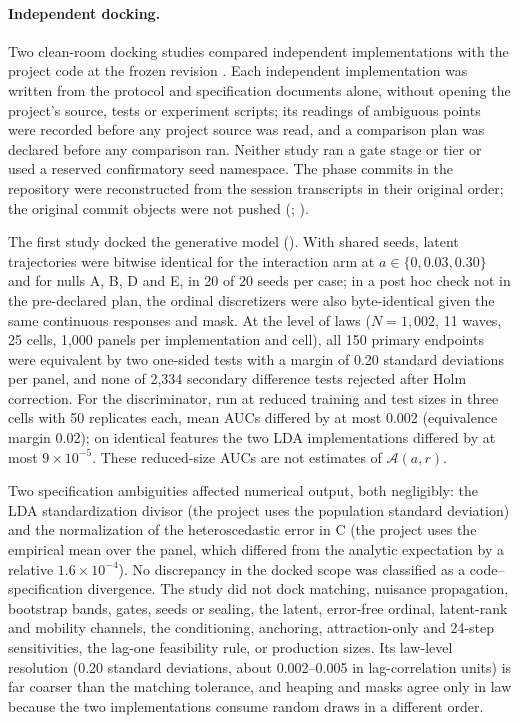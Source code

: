 \paragraph{Independent docking.}
Two clean-room docking studies compared independent implementations with the project code at the frozen revision . Each independent implementation was written from the protocol and specification documents alone, without opening the project's source, tests or experiment scripts; its readings of ambiguous points were recorded before any project source was read, and a comparison plan was declared before any comparison ran. Neither study ran a gate stage or tier or used a reserved confirmatory seed namespace. The phase commits in the repository were reconstructed from the session transcripts in their original order; the original commit objects were not pushed (; ).

The first study docked the generative model (). With shared seeds, latent trajectories were bitwise identical for the interaction arm at $a\in\{0,0.03,0.30\}$ and for nulls A, B, D and E, in 20 of 20 seeds per case; in a post hoc check not in the pre-declared plan, the ordinal discretizers were also byte-identical given the same continuous responses and mask. At the level of laws ($N=1{,}002$, 11 waves, 25 cells, 1,000 panels per implementation and cell), all 150 primary endpoints were equivalent by two one-sided tests with a margin of 0.20 standard deviations per panel, and none of 2,334 secondary difference tests rejected after Holm correction. For the discriminator, run at reduced training and test sizes in three cells with 50 replicates each, mean AUCs differed by at most 0.002 (equivalence margin 0.02); on identical features the two LDA implementations differed by at most $9\times10^{-5}$. These reduced-size AUCs are not estimates of $\mathcal A(a,r)$.

Two specification ambiguities affected numerical output, both negligibly: the LDA standardization divisor (the project uses the population standard deviation) and the normalization of the heteroscedastic error in C (the project uses the empirical mean over the panel, which differed from the analytic expectation by a relative $1.6\times10^{-4}$). No discrepancy in the docked scope was classified as a code--specification divergence. The study did not dock matching, nuisance propagation, bootstrap bands, gates, seeds or sealing, the latent, error-free ordinal, latent-rank and mobility channels, the conditioning, anchoring, attraction-only and 24-step sensitivities, the lag-one feasibility rule, or production sizes. Its law-level resolution (0.20 standard deviations, about 0.002--0.005 in lag-correlation units) is far coarser than the matching tolerance, and heaping and masks agree only in law because the two implementations consume random draws in a different order.

